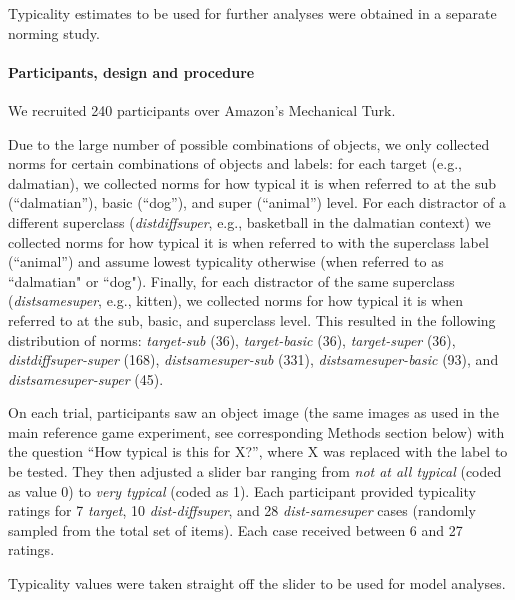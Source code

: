 \documentclass[10pt,letterpaper]{article}
\newcommand{\jd}[1]{\textcolor{Blue}{[jd: #1]}}
\newcommand{\ndg}[1]{\textcolor{Green}{[ndg: #1]}}
\begin{document}
Typicality estimates to be used for further analyses were obtained in a separate norming study. 

\paragraph{\bf Participants, design and procedure}
We recruited 240 participants over Amazon's Mechanical Turk.

Due to the large number of possible combinations of objects, we only collected norms for certain combinations of objects and labels: for each target (e.g., dalmatian), we collected norms for how typical it is when referred to at the sub (``dalmatian''), basic (``dog''), and super (``animal'') level. For each distractor of a different superclass (\emph{distdiffsuper}, e.g., basketball in the dalmatian context) we collected norms for how typical it is when referred to with the superclass label (``animal'') and assume lowest typicality otherwise (when referred to as ``dalmatian" or ``dog"). Finally, for each distractor of the same superclass (\emph{distsamesuper}, e.g., kitten), we collected norms for how typical it is when referred to at the sub, basic, and superclass level. This resulted in the following distribution of norms:  \emph{target-sub} (36), \emph{target-basic} (36), \emph{target-super} (36), \emph{distdiffsuper-super} (168), \emph{distsamesuper-sub} (331), \emph{distsamesuper-basic} (93), and \emph{distsamesuper-super} (45). 

On each trial, participants saw an object image (the same images as used in the main reference game experiment, see corresponding Methods section below) with the question ``How typical is this for X?'', where X was replaced with the label to be tested. They then adjusted a slider bar ranging from \emph{not at all typical} (coded as value 0) to \emph{very typical} (coded as 1). Each participant provided typicality ratings for 7 \emph{target}, 10 \emph{dist-diffsuper}, and 28 \emph{dist-samesuper} cases (randomly sampled from the total set of items). Each case received between 6 and 27 ratings. 

Typicality values were taken straight off the slider to be used for model analyses.


\end{document}
